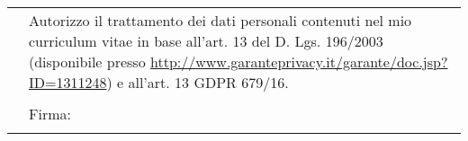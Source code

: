 \documentclass[totpages,helvetica,openbib,italian,flagCMYK]{europecv}
\begin{document}
\null{}
\flushright
\begin{tabular}{rp{250pt}}
 & \small Autorizzo il trattamento dei dati personali contenuti nel mio curriculum vitae in base all’art. 13 del D. Lgs. 196/2003 (disponibile presso
 \url{http://www.garanteprivacy.it/garante/doc.jsp?ID=1311248}) e all’art. 13 GDPR 679/16.
 \\
 &  \\ 
 & Firma:\\ 
 & \underline{\hspace{250pt}} \\
\end{tabular} 
\end{document}
